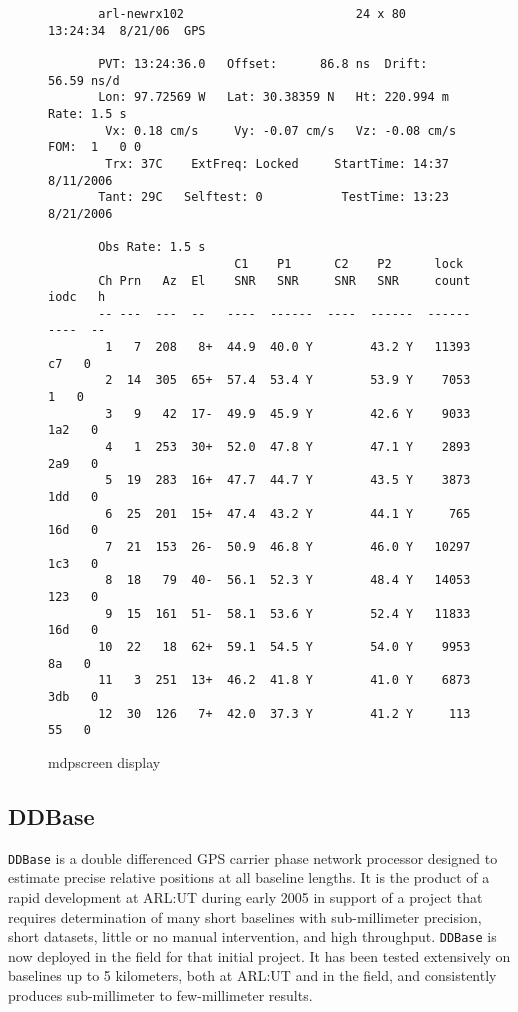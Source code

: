 \documentclass{ion-gps}
\newcommand{\gpstkapplication}[1]{\texttt{#1}}
\begin{document}
\begin{figure*}[htbp]
\begin{small}
\begin{bf}
\begin{lstlisting}
       arl-newrx102                        24 x 80               13:24:34  8/21/06  GPS

       PVT: 13:24:36.0   Offset:      86.8 ns  Drift:     56.59 ns/d
       Lon: 97.72569 W   Lat: 30.38359 N   Ht: 220.994 m    Rate: 1.5 s
        Vx: 0.18 cm/s     Vy: -0.07 cm/s   Vz: -0.08 cm/s   FOM:  1   0 0 
        Trx: 37C    ExtFreq: Locked     StartTime: 14:37 8/11/2006
       Tant: 29C   Selftest: 0           TestTime: 13:23 8/21/2006

       Obs Rate: 1.5 s
                          C1    P1      C2    P2      lock
       Ch Prn   Az  El    SNR   SNR     SNR   SNR     count  iodc   h
       -- ---  ---  --   ----  ------  ----  ------  ------  ----  --
        1   7  208   8+  44.9  40.0 Y        43.2 Y   11393    c7   0
        2  14  305  65+  57.4  53.4 Y        53.9 Y    7053     1   0
        3   9   42  17-  49.9  45.9 Y        42.6 Y    9033   1a2   0
        4   1  253  30+  52.0  47.8 Y        47.1 Y    2893   2a9   0
        5  19  283  16+  47.7  44.7 Y        43.5 Y    3873   1dd   0
        6  25  201  15+  47.4  43.2 Y        44.1 Y     765   16d   0
        7  21  153  26-  50.9  46.8 Y        46.0 Y   10297   1c3   0
        8  18   79  40-  56.1  52.3 Y        48.4 Y   14053   123   0
        9  15  161  51-  58.1  53.6 Y        52.4 Y   11833   16d   0
       10  22   18  62+  59.1  54.5 Y        54.0 Y    9953    8a   0
       11   3  251  13+  46.2  41.8 Y        41.0 Y    6873   3db   0
       12  30  126   7+  42.0  37.3 Y        41.2 Y     113    55   0
\end{lstlisting}
\end{bf}
\end{small}
\caption{mdpscreen display}
\label{fig:mdpscreendump}
\end{figure*}


\subsection*{DDBase}

\gpstkapplication{DDBase} is a double differenced GPS carrier phase
network processor designed to estimate precise relative positions at
all baseline lengths. It is the product of a rapid development at
ARL:UT during early 2005 in support of a project that requires
determination of many short baselines with sub-millimeter precision,
short datasets, little or no manual intervention, and high
throughput. \gpstkapplication{DDBase} is now deployed in the field for
that initial project\cite{ion:gstss06}. It has been tested extensively
on baselines up to 5 kilometers, both at ARL:UT and in the field, and
consistently produces sub-millimeter to few-millimeter results.
\end{document}
